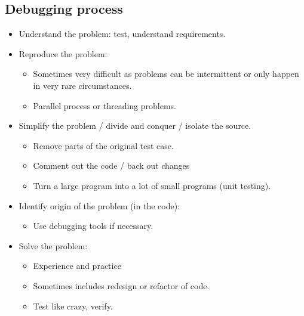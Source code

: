 \subsection{Debugging process}
\begin{itemize}
    \item Understand the problem: test, understand requirements. 
    \item Reproduce the problem: 
        \begin{itemize}
            \item Sometimes very difficult as problems can be intermittent or only happen in very rare circumstances. 
            \item Parallel process or threading problems. 
        \end{itemize}
    
    \item Simplify the problem / divide and conquer / isolate the source.
        \begin{itemize}
            \item Remove parts of the original test case. 
            \item Comment out the code / back out changes 
            \item Turn a large program into a lot of small programs (unit testing).
        \end{itemize}
    
    \item Identify origin of the problem (in the code):
        \begin{itemize}
            \item Use debugging tools if necessary. 
        \end{itemize}
    
    \item Solve the problem: 
        \begin{itemize}
            \item Experience and practice 
            \item Sometimes includes redesign or refactor of code. 
            \item Test like crazy, verify. 
        \end{itemize}
\end{itemize}

